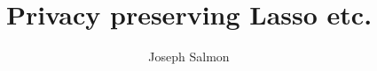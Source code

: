 \documentclass[a4paper,10pt]{article}
\author{Joseph Salmon}
\title{Privacy preserving Lasso etc.}
\theoremstyle{definition}
\begin{document}
\maketitle

\vskip 0.3in

\begin{abstract}

\end{abstract}






% 

\newpage


\end{document}
